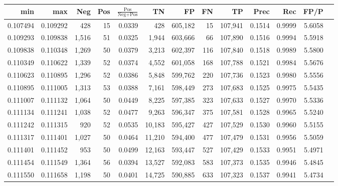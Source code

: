 \begin{tabular}{rrrrrrrrrrrrr}
\toprule
     min &      max &   Neg & Pos & $\frac{\text{Pos}}{\text{Neg}+\text{Pos}}$ &      TN &      FP &      FN &      TP &   Prec &    Rec &   FP/P \\
\midrule
0.107494 & 0.109292 &   428 &  15 &                                     0.0339 &     428 & 605,182 &      15 & 107,941 & 0.1514 & 0.9999 & 5.6058 \\
0.109293 & 0.109838 & 1,516 &  51 &                                     0.0325 &   1,944 & 603,666 &      66 & 107,890 & 0.1516 & 0.9994 & 5.5918 \\
0.109838 & 0.110348 & 1,269 &  50 &                                     0.0379 &   3,213 & 602,397 &     116 & 107,840 & 0.1518 & 0.9989 & 5.5800 \\
0.110349 & 0.110622 & 1,339 &  52 &                                     0.0374 &   4,552 & 601,058 &     168 & 107,788 & 0.1521 & 0.9984 & 5.5676 \\
0.110623 & 0.110895 & 1,296 &  52 &                                     0.0386 &   5,848 & 599,762 &     220 & 107,736 & 0.1523 & 0.9980 & 5.5556 \\
0.110895 & 0.111005 & 1,313 &  53 &                                     0.0388 &   7,161 & 598,449 &     273 & 107,683 & 0.1525 & 0.9975 & 5.5435 \\
0.111007 & 0.111132 & 1,064 &  50 &                                     0.0449 &   8,225 & 597,385 &     323 & 107,633 & 0.1527 & 0.9970 & 5.5336 \\
0.111134 & 0.111241 & 1,038 &  52 &                                     0.0477 &   9,263 & 596,347 &     375 & 107,581 & 0.1528 & 0.9965 & 5.5240 \\
0.111242 & 0.111315 &   920 &  52 &                                     0.0535 &  10,183 & 595,427 &     427 & 107,529 & 0.1530 & 0.9960 & 5.5155 \\
0.111317 & 0.111401 & 1,027 &  50 &                                     0.0464 &  11,210 & 594,400 &     477 & 107,479 & 0.1531 & 0.9956 & 5.5059 \\
0.111401 & 0.111452 &   953 &  50 &                                     0.0499 &  12,163 & 593,447 &     527 & 107,429 & 0.1533 & 0.9951 & 5.4971 \\
0.111454 & 0.111549 & 1,364 &  56 &                                     0.0394 &  13,527 & 592,083 &     583 & 107,373 & 0.1535 & 0.9946 & 5.4845 \\
0.111550 & 0.111658 & 1,198 &  50 &                                     0.0401 &  14,725 & 590,885 &     633 & 107,323 & 0.1537 & 0.9941 & 5.4734 \\

\end{tabular}
